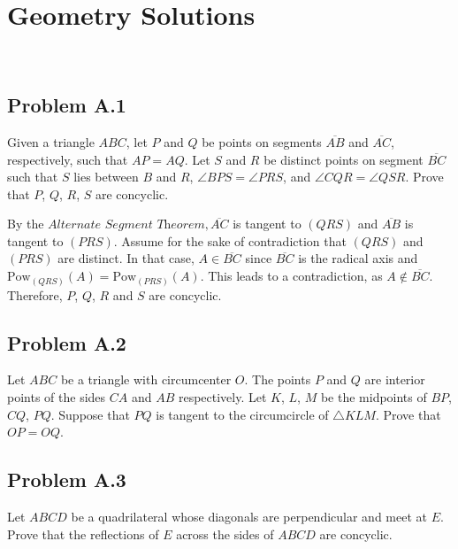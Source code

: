 \documentclass[12pt]{article}
\begin{document}
    \clearpage

  \section{\textsf{Geometry Solutions}}
    \
    \subsection{Problem A.1}
      \begin{tcolorbox}[problembox=Problem statement]
        Given a triangle $ABC$, let $P$ and $Q$ be points on segments $\overline{AB}$ and $\overline{AC}$,
        respectively, such that $AP = AQ$. Let $S$ and $R$ be distinct points on segment $\overline{BC}$
        such that $S$ lies between $B$ and $R$, $\angle BPS = \angle PRS$, and $\angle CQR = \angle QSR$.
        Prove that $P$, $Q$, $R$, $S$ are concyclic.
      \end{tcolorbox}
      By the $\textit{Alternate Segment Theorem}, \overline{AC}$ is tangent to $(QRS)$ and $\overline{AB}$
      is tangent to $(PRS)$. Assume for the sake of contradiction that $(QRS)$ and $(PRS)$ are distinct. In that case,
      $A \in \overline{BC}$ since $\overline{BC}$ is the radical axis and $\text{Pow}_{(QRS)}(A) =
      \text{Pow}_{(PRS)}(A)$. This leads to a contradiction, as $A \notin \overline{BC}$. Therefore,
      $P$, $Q$, $R$ and $S$ are concyclic.

    \clearpage

    \subsection{Problem A.2}
      \begin{tcolorbox}[problembox]
        Let $ABC$ be a triangle with circumcenter $O$. The points $P$ and $Q$ are interior points of the sides $CA$
        and $AB$ respectively. Let $K$, $L$, $M$ be the midpoints of $BP$, $CQ$, $PQ$. Suppose that $PQ$ is tangent to the circumcircle 
        of $\triangle KLM$. Prove that $OP = OQ$.

      \end{tcolorbox}

    \clearpage

    \subsection{Problem A.3}
      \begin{tcolorbox}[problembox]
        Let $ABCD$ be a quadrilateral whose diagonals are perpendicular and meet at $E$. Prove that the reflections
        of $E$ across the sides of $ABCD$ are concyclic.
      \end{tcolorbox}
\end{document}

